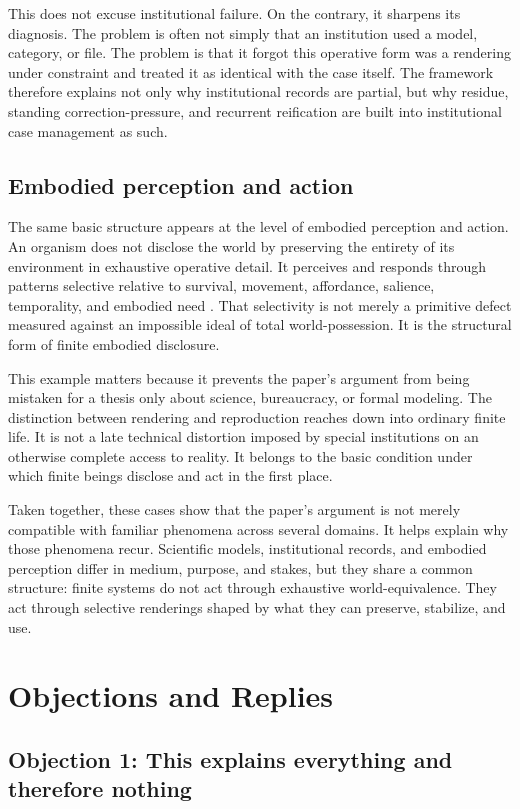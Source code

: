 \documentclass[11pt]{article}
\begin{document}
This does not excuse institutional failure. On the contrary, it sharpens its diagnosis. The problem is often not simply that an institution used a model, category, or file. The problem is that it forgot this operative form was a rendering under constraint and treated it as identical with the case itself. The framework therefore explains not only why institutional records are partial, but why residue, standing correction-pressure, and recurrent reification are built into institutional case management as such.

\subsection{Embodied perception and action}

The same basic structure appears at the level of embodied perception and action. An organism does not disclose the world by preserving the entirety of its environment in exhaustive operative detail. It perceives and responds through patterns selective relative to survival, movement, affordance, salience, temporality, and embodied need \cite{Gibson1979EcologicalApproachVisualPerception}. That selectivity is not merely a primitive defect measured against an impossible ideal of total world-possession. It is the structural form of finite embodied disclosure.

This example matters because it prevents the paper's argument from being mistaken for a thesis only about science, bureaucracy, or formal modeling. The distinction between rendering and reproduction reaches down into ordinary finite life. It is not a late technical distortion imposed by special institutions on an otherwise complete access to reality. It belongs to the basic condition under which finite beings disclose and act in the first place.

Taken together, these cases show that the paper's argument is not merely compatible with familiar phenomena across several domains. It helps explain why those phenomena recur. Scientific models, institutional records, and embodied perception differ in medium, purpose, and stakes, but they share a common structure: finite systems do not act through exhaustive world-equivalence. They act through selective renderings shaped by what they can preserve, stabilize, and use.
\section{Objections and Replies}

\subsection{Objection 1: This explains everything and therefore nothing}
\end{document}
